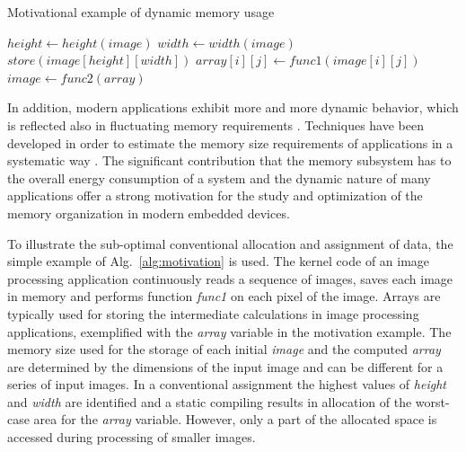 \begin{algorithm}
\caption{Motivational example of dynamic memory usage}
 \label{alg:motivation}
 \begin{algorithmic}[1]
		\STATE $height \gets height(image)$
		\STATE $width \gets width(image)$
		\STATE $store(image[height][width])$
					\STATE $array[i][j] \gets func1(image[i][j])$
				\ENDFOR
			\ENDFOR
		\STATE $image \gets func2(array)$	
	\ENDWHILE
 \end{algorithmic}
\end{algorithm}

In addition, modern applications exhibit more and more dynamic behavior, which is reflected also in fluctuating memory requirements \cite{tcm}. 
Techniques have been developed in order to estimate the memory size requirements of applications in a systematic way \cite{Ang13}. 
The significant contribution that the memory subsystem has to the overall energy consumption of a system and the dynamic nature of many applications offer a strong motivation for the study and optimization of the memory organization in modern embedded devices.

To illustrate the sub-optimal conventional allocation and assignment of data, the simple example of Alg.~\ref{alg:motivation} is used. 
The kernel code of an image processing application continuously reads a sequence of images, saves each image in memory and performs function \textit{func1} on each pixel of the image. 
Arrays are typically used for storing the intermediate calculations in image processing applications, exemplified with the \textit{array} variable in the motivation example. 
The memory size used for the storage of each initial \textit{image} and the computed \textit{array} are determined by the dimensions of the input image and can be different for a series of input images. 
In a conventional assignment the highest values of \textit{height} and \textit{width} are identified and a static compiling results in allocation of the worst-case area for the \textit{array} variable. 
However, only a part of the allocated space is accessed during processing of smaller images. 


